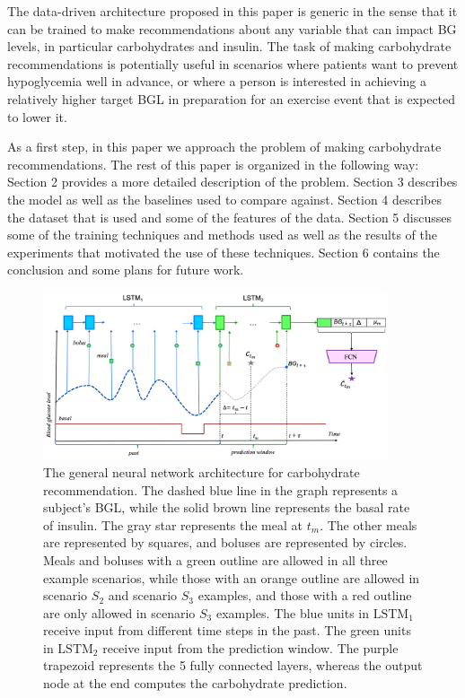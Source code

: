 \documentclass{ecai}
\begin{document}
The data-driven architecture proposed in this paper is generic in the sense that it can be trained to make recommendations about any variable that can impact BG levels, in particular carbohydrates and insulin. The task of making carbohydrate recommendations is potentially useful in scenarios where patients want to prevent hypoglycemia well in advance, or where a person is interested in achieving a relatively higher target BGL in preparation for an exercise event that is expected to lower it.

As a first step, in this paper we approach the problem of making carbohydrate recommendations.
The rest of this paper is organized in the following way: Section 2 provides a more detailed description of the problem. Section 3 describes the model as well as the baselines used to compare against. Section 4 describes the dataset that is used and some of the features of the data. Section 5 discusses some of the training techniques and methods used as well as the results of the experiments that motivated the use of these techniques. Section 6 contains the conclusion and some plans for future work.
 

\begin{figure}[t]
    \centering
    \includegraphics[width=0.9\textwidth]{kdh_paper_diagram}
    \caption{The general neural network architecture for carbohydrate recommendation. The dashed blue line in the graph represents a subject's BGL, while the solid brown line represents the basal rate of insulin. The gray star represents the meal at $t_{m}$. The other meals are represented by squares, and boluses are represented by circles. Meals and boluses with a green outline are allowed in all three example scenarios, while those with an orange outline are allowed in scenario $S_2$ and scenario $S_3$ examples, and those with a red outline are only allowed in scenario $S_3$ examples. The blue units in $\text{LSTM}_{1}$ receive input from different time steps in the past. The green units in $\text{LSTM}_{2}$ receive input from the prediction window. The purple trapezoid represents the 5 fully connected layers, whereas the output node at the end computes the carbohydrate prediction.}
    \label{fig:diagram}
\end{figure}
\end{document}
